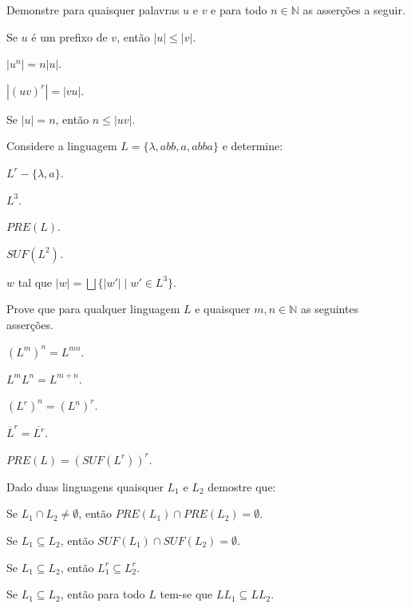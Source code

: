 \begin{questao}\label{exer:LF2}
	Demonstre para quaisquer palavras $u$ e $v$ e para todo $n \in \mathbb{N}$ as asserções a seguir.
\end{questao}

\begin{exerList}
	\item Se $u$ é um prefixo de $v$, então $|u| \leq |v|$.
	\item $|u^n| = n|u|$.
	\item $|(uv)^r| = |vu|$.
	\item Se $|u| = n$, então $n \leq |uv|$.
\end{exerList}

\begin{questao}\label{exer:LF3}
	Considere a linguagem $L = \{\lambda, abb, a, abba\}$ e determine:
\end{questao}

\begin{exerList}
	\item $L^r - \{\lambda, a\}$.
	\item $L^3$.
	\item $PRE(L)$.
	\item $SUF(L^2)$.
	\item $w$ tal que $|w| = \bigsqcup \{|w'| \mid w' \in L^3\}$.
\end{exerList}

\begin{questao}\label{exer:LF4}
	Prove que para qualquer linguagem $L$ e quaisquer $m,n \in \mathbb{N}$ as seguintes asserções.
\end{questao}

\begin{exerList}
	\item $(L^m)^n = L^{mn}$.
	\item $L^mL^n = L^{m+n}$.
	\item $(L^r)^n = (L^n)^r$.
	\item $\overline{L}^r = \overline{L^r}$.
	\item $PRE(L) = (SUF(L^r))^r$.
\end{exerList}

\begin{questao}\label{exer:LF5}
	Dado duas linguagens quaisquer $L_1$ e $L_2$ demostre que:
\end{questao}

\begin{exerList}
	\item Se $L_1 \cap L_2 \neq \emptyset$, então $PRE(L_1) \cap PRE(L_2) = \emptyset$.
	\item Se $L_1 \subseteq L_2$, então $SUF(L_1) \cap SUF(L_2) = \emptyset$.
	\item Se $L_1 \subseteq L_2$, então $L_1^r \subseteq L_2^r$.
	\item Se $L_1 \subseteq L_2$, então para todo $L$ tem-se que $LL_1 \subseteq LL_2$. 
\end{exerList}

